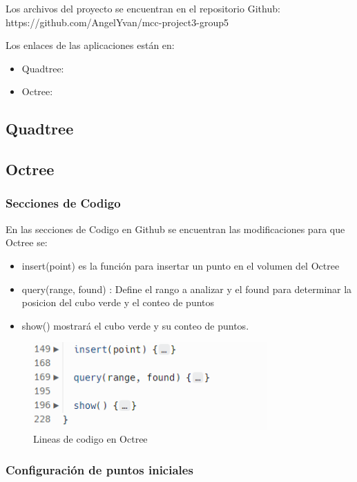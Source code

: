 \documentclass{article}
\begin{document}
Los archivos del proyecto se encuentran en el repositorio Github: https://github.com/AngelYvan/mcc-project3-group5

Los enlaces  de las aplicaciones están en:

\begin{itemize}
    \item Quadtree:
    \item Octree:
\end{itemize}

\subsection{Quadtree}

\subsection{Octree}
\subsubsection{Secciones de Codigo}

En las secciones de Codigo en Github se encuentran las modificaciones para que Octree se:

\begin{itemize}
    \item insert(point) es la función para insertar un punto en el volumen del Octree
    \item query(range, found) : Define el rango a analizar y el found para determinar la posicion del cubo verde y el conteo de puntos
    \item show() mostrará el cubo verde y su conteo de puntos.
\end{itemize}

\begin{figure}[H]
\centering
\includegraphics[width=0.8\textwidth]{img/oct_code.png}
\caption{Lineas de codigo en Octree}
\end{figure}



\subsubsection{Configuración de puntos iniciales}
\end{document}
